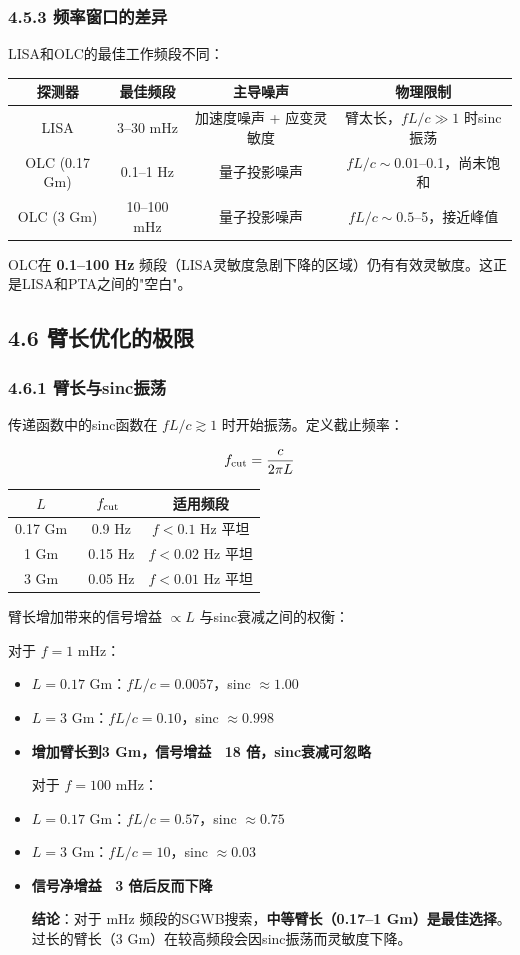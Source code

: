 \documentclass[12pt,a4paper]{article}
\begin{document}
\subsubsection{4.5.3 频率窗口的差异}


LISA和OLC的最佳工作频段不同：

\begin{tabular}{|c|c|c|c|}
\hline
探测器 & 最佳频段 & 主导噪声 & 物理限制 \\
\hline
LISA & 3–30 mHz & 加速度噪声 + 应变灵敏度 & 臂太长，$fL/c \gg 1$ 时sinc振荡 \\
OLC (0.17 Gm) & 0.1–1 Hz & 量子投影噪声 & $fL/c \sim 0.01$–0.1，尚未饱和 \\
OLC (3 Gm) & 10–100 mHz & 量子投影噪声 & $fL/c \sim 0.5$–5，接近峰值 \\
\hline
\end{tabular}


OLC在 \textbf{0.1–100 Hz} 频段（LISA灵敏度急剧下降的区域）仍有有效灵敏度。这正是LISA和PTA之间的"空白"。

\subsection{4.6 臂长优化的极限}


\subsubsection{4.6.1 臂长与sinc振荡}


传递函数中的sinc函数在 $fL/c \gtrsim 1$ 时开始振荡。定义截止频率：

$$f_{\rm cut} = \frac{c}{2\pi L}$$

\begin{tabular}{|c|c|c|}
\hline
$L$ & $f_{\rm cut}$ & 适用频段 \\
\hline
0.17 Gm & ~0.9 Hz & $f < 0.1$ Hz 平坦 \\
1 Gm & ~0.15 Hz & $f < 0.02$ Hz 平坦 \\
3 Gm & ~0.05 Hz & $f < 0.01$ Hz 平坦 \\
\hline
\end{tabular}


臂长增加带来的信号增益 $\propto L$ 与sinc衰减之间的权衡：

对于 $f = 1$ mHz：
\begin{itemize}
  \item $L = 0.17$ Gm：$fL/c = 0.0057$，sinc $\approx 1.00$
  \item $L = 3$ Gm：$fL/c = 0.10$，sinc $\approx 0.998$
  \item \textbf{增加臂长到3 Gm，信号增益 ~18 倍，sinc衰减可忽略}

对于 $f = 100$ mHz：
  \item $L = 0.17$ Gm：$fL/c = 0.57$，sinc $\approx 0.75$
  \item $L = 3$ Gm：$fL/c = 10$，sinc $\approx 0.03$
  \item \textbf{信号净增益 ~3 倍后反而下降}

\textbf{结论}：对于 mHz 频段的SGWB搜索，\textbf{中等臂长（0.17–1 Gm）是最佳选择}。过长的臂长（3 Gm）在较高频段会因sinc振荡而灵敏度下降。

\end{itemize}
\end{document}
